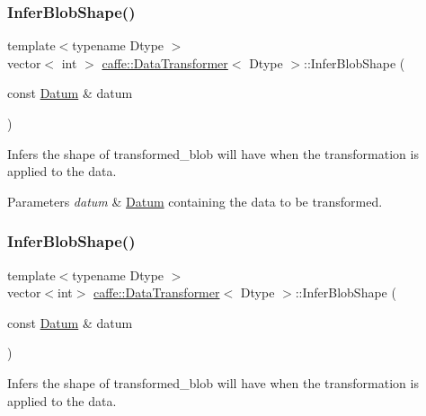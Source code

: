 \subsubsection{\texorpdfstring{Infer\+Blob\+Shape()}{InferBlobShape()}\hspace{0.1cm}{\footnotesize\ttfamily [1/4]}}
{\footnotesize\ttfamily template$<$typename Dtype $>$ \\
vector$<$ int $>$ \mbox{\hyperlink{classcaffe_1_1_data_transformer}{caffe\+::\+Data\+Transformer}}$<$ Dtype $>$\+::Infer\+Blob\+Shape (\begin{DoxyParamCaption}\item[{const \mbox{\hyperlink{classcaffe_1_1_datum}{Datum}} \&}]{datum }\end{DoxyParamCaption})}



Infers the shape of transformed\+\_\+blob will have when the transformation is applied to the data. 


\begin{DoxyParams}{Parameters}
{\em datum} & \mbox{\hyperlink{classcaffe_1_1_datum}{Datum}} containing the data to be transformed. \\
\hline
\end{DoxyParams}
\mbox{\label{classcaffe_1_1_data_transformer_a4a8e7feba153c9c671d0aabc8f12e65b}} 
\subsubsection{\texorpdfstring{Infer\+Blob\+Shape()}{InferBlobShape()}\hspace{0.1cm}{\footnotesize\ttfamily [2/4]}}
{\footnotesize\ttfamily template$<$typename Dtype $>$ \\
vector$<$int$>$ \mbox{\hyperlink{classcaffe_1_1_data_transformer}{caffe\+::\+Data\+Transformer}}$<$ Dtype $>$\+::Infer\+Blob\+Shape (\begin{DoxyParamCaption}\item[{const \mbox{\hyperlink{classcaffe_1_1_datum}{Datum}} \&}]{datum }\end{DoxyParamCaption})}



Infers the shape of transformed\+\_\+blob will have when the transformation is applied to the data. 


